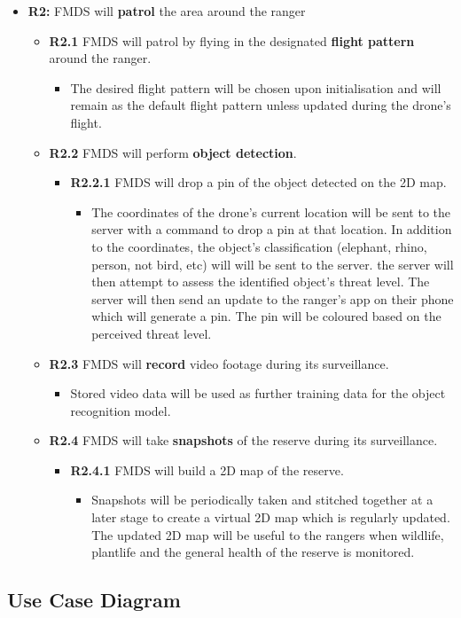 \begin{flushleft}
		\begin{itemize}
			\item{\textbf{R2:}} FMDS will \textbf{patrol} the area around the ranger
				\begin{itemize}
					\item{\textbf{R2.1}} FMDS will patrol by flying in the designated \textbf{flight pattern} around the ranger.
						\begin{itemize}
							\item The desired flight pattern will be chosen upon initialisation and will remain as the default flight pattern unless updated during the drone's flight.
						\end{itemize}
					\item{\textbf{R2.2}} FMDS will perform \textbf{object detection}.
						\begin{itemize}
							\item{\textbf{R2.2.1}} FMDS will drop a pin of the object detected on the 2D map.
								\begin{itemize}
									\item The coordinates of the drone's current location will be sent to the server with a command to drop a pin at that location. In addition to the coordinates, the object's classification (elephant, rhino, person, not bird, etc) will will be sent to the server. the server will then attempt to assess the identified object's threat level. The server will then send an update to the ranger's app on their phone which will generate a pin. The pin will be coloured based on the perceived threat level. 
								\end{itemize} 
						\end{itemize}
					\item{\textbf{R2.3}} FMDS will \textbf{record} video footage during its surveillance.
						\begin{itemize}
							\item Stored video data will be used as further training data for the object recognition model.
						\end{itemize} 
					\item{\textbf{R2.4}} FMDS will take \textbf{snapshots} of the reserve during its surveillance.
						\begin{itemize}
							\item{\textbf{R2.4.1}} FMDS will build a 2D map of the reserve.
								\begin{itemize}
									\item Snapshots will be periodically taken and stitched together at a later stage to create a virtual 2D map which is regularly updated. The updated 2D map will be useful to the rangers when wildlife, plantlife and the general health of the reserve is monitored.
								\end{itemize} 
						\end{itemize}
				\end{itemize}
		\end{itemize}
	\end{flushleft}

\subsection{Use Case Diagram}
